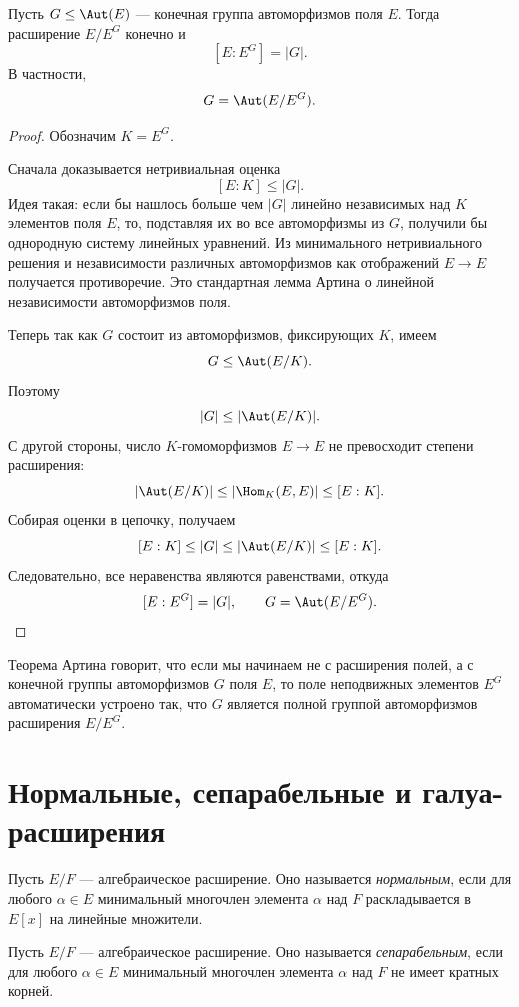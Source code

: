 \begin{theorem}
Пусть $G \leq \Aut(E)$ --- конечная группа автоморфизмов поля $E$. Тогда расширение $E / E^G$ конечно и
\[
    [E : E^G] = |G|.
\]
В частности,
\[
    G = \Aut(E / E^G).
\]
\begin{proof}
Обозначим $K = E^G$.

Сначала доказывается нетривиальная оценка
\[
    [E : K] \leq |G|.
\]
Идея такая: если бы нашлось больше чем $|G|$ линейно независимых над $K$ элементов поля $E$, то, подставляя их во все автоморфизмы из
$G$, получили бы однородную систему линейных уравнений. Из минимального нетривиального решения и независимости различных автоморфизмов как отображений
$E \to E$ получается противоречие. Это стандартная лемма Артина о линейной независимости автоморфизмов поля.

Теперь так как $G$ состоит из автоморфизмов, фиксирующих $K$, имеем
\[
    G \leq \Aut(E/K).
\]
Поэтому
\[
    |G| \leq |\Aut(E/K)|.
\]
С другой стороны, число $K$-гомоморфизмов $E \to E$ не превосходит степени расширения:
\[
    |\Aut(E/K)| \leq |\Hom_K(E,E)| \leq [E:K].
\]
Собирая оценки в цепочку, получаем
\[
    [E:K] \leq |G| \leq |\Aut(E/K)| \leq [E:K].
\]
Следовательно, все неравенства являются равенствами, откуда
\[
    [E:E^G] = |G|,
    \qquad
    G = \Aut(E/E^G).
\]
\end{proof}
\end{theorem}

\begin{remark}
Теорема Артина говорит, что если мы начинаем не с расширения полей, а с конечной группы автоморфизмов
$G$ поля $E$, то поле неподвижных элементов $E^G$ автоматически устроено так, что $G$ является полной группой автоморфизмов расширения
$E / E^G$.
\end{remark}

\section{Нормальные, сепарабельные и галуа-расширения}

\begin{definition}
Пусть $E / F$ --- алгебраическое расширение. Оно называется \emph{нормальным}, если для любого $\alpha \in E$ минимальный многочлен элемента
$\alpha$ над $F$ раскладывается в $E[x]$ на линейные множители.
\end{definition}

\begin{definition}
Пусть $E / F$ --- алгебраическое расширение. Оно называется \emph{сепарабельным}, если для любого $\alpha \in E$ минимальный многочлен элемента
$\alpha$ над $F$ не имеет кратных корней.
\end{definition}

